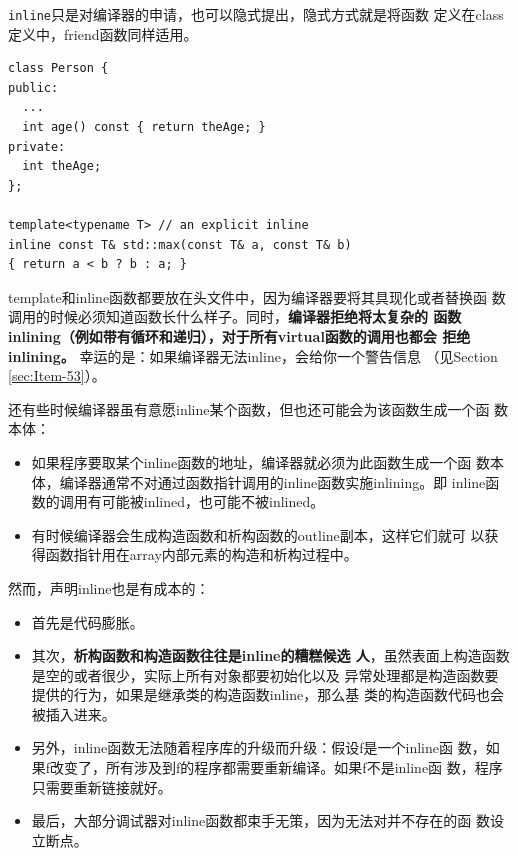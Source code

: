 \documentclass[a4paper,twoside]{article}
\theoremstyle{definition}
\theoremstyle{remark}
\numberwithin{equation}{section}
\let\OldTexttt\texttt
\renewcommand{\texttt}[1]{{\color{blue} \OldTexttt{#1}}}
\begin{document}
\texttt{inline}只是对编译器的申请，也可以隐式提出，隐式方式就是将函数
定义在class定义中，friend函数同样适用。
\begin{verbatim}
class Person {
public:
  ...
  int age() const { return theAge; }
private:
  int theAge;
};

template<typename T> // an explicit inline
inline const T& std::max(const T& a, const T& b)
{ return a < b ? b : a; } 
\end{verbatim}

template和inline函数都要放在头文件中，因为编译器要将其具现化或者替换函
数调用的时候必须知道函数长什么样子。同时，\textbf{编译器拒绝将太复杂的
  函数inlining（例如带有循环和递归），对于所有virtual函数的调用也都会
  拒绝inlining。} 幸运的是：如果编译器无法inline，会给你一个警告信息
（见Section \ref{sec:Item-53}）。

还有些时候编译器虽有意愿inline某个函数，但也还可能会为该函数生成一个函
数本体：
\begin{itemize}
\item 如果程序要取某个inline函数的地址，编译器就必须为此函数生成一个函
  数本体，编译器通常不对通过函数指针调用的inline函数实施inlining。即
  inline函数的调用有可能被inlined，也可能不被inlined。
\item 有时候编译器会生成构造函数和析构函数的outline副本，这样它们就可
  以获得函数指针用在array内部元素的构造和析构过程中。
\end{itemize}

然而，声明inline也是有成本的：
\begin{itemize}
\item 首先是代码膨胀。
\item 其次，\textbf{析构函数和构造函数往往是inline的糟糕候选
  人}，虽然表面上构造函数是空的或者很少，实际上所有对象都要初始化以及
异常处理都是构造函数要提供的行为，如果是继承类的构造函数inline，那么基
类的构造函数代码也会被插入进来。
\item 另外，inline函数无法随着程序库的升级而升级：假设f是一个inline函
  数，如果f改变了，所有涉及到f的程序都需要重新编译。如果f不是inline函
  数，程序只需要重新链接就好。
\item 最后，大部分调试器对inline函数都束手无策，因为无法对并不存在的函
  数设立断点。
\end{itemize}
\end{document}
